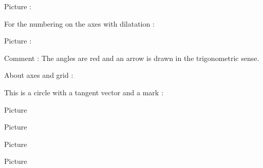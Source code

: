 Picture : 
\begin{center}
   
\end{center}
   

For the numbering on the axes with dilatation : 
\begin{center}
   
\end{center}



Picture : 
\begin{center}
   
\end{center}
Comment : The angles are red and an arrow is drawn in the trigonometric sense.



About axes and grid : 
\begin{center}
   
\end{center}
   


This is a circle with a tangent vector and a mark :

\begin{center}
    
\end{center}



Picture 
\begin{center}
   
\end{center}

Picture 
\begin{center}
   
\end{center}


\clearpage


Picture 
\begin{center}
   
\end{center}
   


\clearpage

Picture 
\begin{center}
   
\end{center}
   


\clearpage

